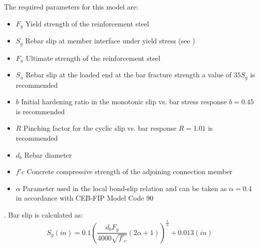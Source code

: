 The required parameters for this model are:
\begin{itemize}
	\item $F_{y}$ Yield strength of the reinforcement steel
	\item $S_{y}$ Rebar slip at member interface under yield stress (see )
	\item $F_{u}$ Ultimate strength of the reinforcement steel
	\item $S_{u}$ Rebar slip at the loaded end at the bar fracture strength a value of $35 S_{y}$ is recommended \cite{Zhao2007}
	\item $b$ Initial hardening ratio in the monotonic slip vs. bar stress response $b=0.45$ is recommended \cite{Zhao2007}
	\item $R$ Pinching factor for the cyclic slip vs. bar response $R=1.01$ is recommended \cite{Zhao2007}
	\item $d_b$ Rebar diameter
	\item $f'c$ Concrete compressive strength of the adjoining connection member
	\item $\alpha$ Parameter used in the local bond-slip relation and can be taken as $\alpha=0.4$ in accordance with CEB-FIP Model Code 90 \cite{CEB1993}
\end{itemize}.
\newline
Bar slip is calculated as:
\begin{equation}
	S_{y}(in)=0.1\left(\frac{d_{b}F_{y}}{4000\sqrt{f'_{c}}}\left(2\alpha+1\right)\right)^{\frac{1}{\alpha}}+0.013 (in)
	\label{eq.Rebar_Slip}
\end{equation}
